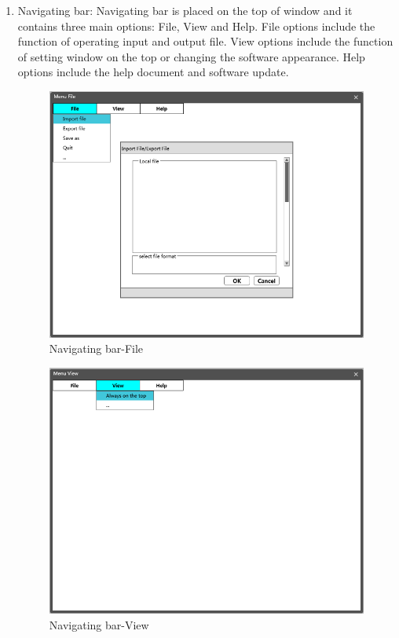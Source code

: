\documentclass[11pt,oneside,a4paper]{article}
\begin{document}
\begin{enumerate}
  \item Navigating bar: Navigating bar is placed on the top of window and it contains three main options: File, View and Help. File options include the function of operating input and output file. View options include the function of setting window on the top or changing the software appearance. Help options include the help document and software update.
  \begin{figure}[H]
    \begin{center}
    \includegraphics[height=0.3\textheight]{./source/Requirement/3.png}
    \caption{Navigating bar-File}
    \label{}
    \end{center}
  \end{figure}

  \begin{figure}[H]
    \begin{center}
    \includegraphics[height=0.3\textheight]{./source/Requirement/4.png}
    \caption{Navigating bar-View}
    \label{}
    \end{center}
  \end{figure}


\end{enumerate}
\end{document}
